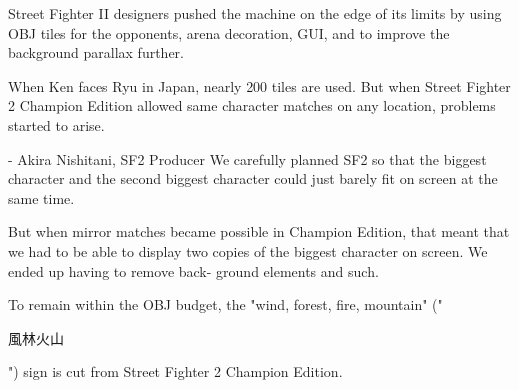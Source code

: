 Street Fighter II designers pushed the machine on the edge of its limits by using OBJ tiles for the opponents, arena decoration, GUI, and to improve the background parallax further.

When Ken faces Ryu in Japan, nearly 200 tiles are used. But when Street Fighter 2 Champion Edition allowed same character matches on any location, problems started to arise.
\vfill
{}
\pagebreak

\begin{q}{- Akira Nishitani, SF2 Producer}
We carefully planned SF2 so that the biggest character and the second biggest character could just barely fit on screen at the same time. 

But when mirror matches became possible in Champion Edition, that meant that we had to be able to display two copies of the biggest character on screen. We ended up having to remove back- ground elements and such.
\end{q}
To remain within the OBJ budget, the "wind, forest, fire, mountain" ("\begin{CJK}{UTF8}{min}風林火山\end{CJK}") sign is cut from Street Fighter 2 Champion Edition.
\vfill
{}
\pagebreak

\begin{minipage}[t]{0.32\linewidth}
\end{minipage}%
\hfill%
\begin{minipage}[t]{0.32\linewidth}
\end{minipage}
\hfill%
\begin{minipage}[t]{0.32\linewidth}
\end{minipage}

\begin{minipage}[t]{0.32\linewidth}
\end{minipage}%
\hfill%
\begin{minipage}[t]{0.32\linewidth}
\end{minipage}
\hfill%
\begin{minipage}[t]{0.32\linewidth}
\end{minipage}

\begin{minipage}[t]{0.32\linewidth}
\end{minipage}%
\hfill%
\begin{minipage}[t]{0.32\linewidth}
\end{minipage}
\hfill%
\begin{minipage}[t]{0.32\linewidth}
\end{minipage}


